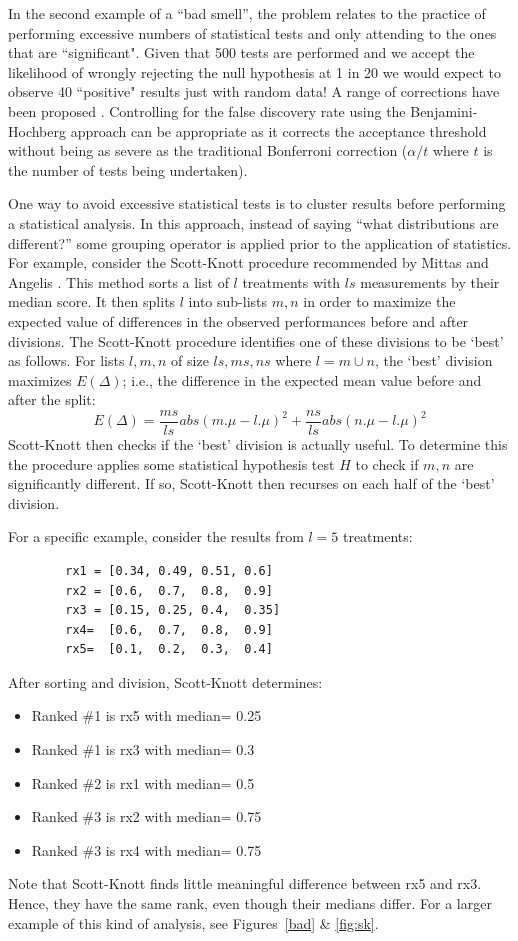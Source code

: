 \documentclass[preprint,10pt]{elsarticle}
\newcommand{\bi}{\begin{itemize}}
\newcommand{\ei}{\end{itemize}}
\begin{document}
In the second example of a ``bad smell'', the problem relates to the practice of performing excessive numbers of statistical tests and only attending to the ones that are ``significant".  Given that 500 tests are performed and we accept the likelihood of wrongly rejecting the null hypothesis at 1 in 20 we would expect to observe 40 ``positive" results just with random data!  A range of corrections have been proposed \cite{Bend01}.  Controlling for the false discovery rate using the Benjamini-Hochberg approach \cite{Benj01} can be appropriate as it corrects the acceptance threshold without being as severe as the traditional Bonferroni correction ($\alpha / t$ where $t$ is the number of tests being undertaken).

One way to avoid excessive statistical tests is to cluster results before performing a statistical analysis. In this approach, instead of saying ``what distributions are different?'' some grouping operator is applied prior to the application of statistics.  For example, consider the   Scott-Knott procedure recommended by Mittas and Angelis \cite{mittas2013ranking}.  This method sorts a list of $l$ treatments with $\mathit{ls}$ measurements by their median score. It then splits $l$ into sub-lists $m,n$ in order to maximize the expected value of differences in the observed performances before and after divisions.  The Scott-Knott procedure identifies one of these divisions to be `best' as follows.  For lists $l,m,n$ of size $\mathit{ls},\mathit{ms},\mathit{ns}$ where $l=m\cup n$, the `best' division maximizes $E(\Delta)$; i.e., the difference in the expected mean value before and after the split: 
 \[E(\Delta)=\frac{ms}{ls}abs(m.\mu - l.\mu)^2 + \frac{ns}{ls}abs(n.\mu - l.\mu)^2\]
Scott-Knott then checks if the `best' division is actually useful. To determine this the procedure applies some statistical hypothesis test $H$ to check if $m, n$ are significantly different. If so, Scott-Knott then recurses on each half of the `best' division.
 
For a specific example, consider the results from $l=5$ treatments:

{\small 
\begin{verbatim}
        rx1 = [0.34, 0.49, 0.51, 0.6]
        rx2 = [0.6,  0.7,  0.8,  0.9]
        rx3 = [0.15, 0.25, 0.4,  0.35]
        rx4=  [0.6,  0.7,  0.8,  0.9]
        rx5=  [0.1,  0.2,  0.3,  0.4]
\end{verbatim}
}

\noindent
After sorting and division, Scott-Knott determines:
\bi
\item Ranked \#1 is rx5 with median= 0.25
\item Ranked \#1 is rx3 with median= 0.3
\item Ranked \#2 is rx1 with median= 0.5
\item Ranked \#3 is rx2 with median= 0.75
\item Ranked \#3 is rx4 with median= 0.75
\ei
Note that Scott-Knott finds little meaningful difference between rx5 and rx3. Hence, they have the same rank, even though their medians differ.  For a larger example of this kind of analysis, see Figures~\ref{bad} \& \ref{fig:sk}.
\end{document}
